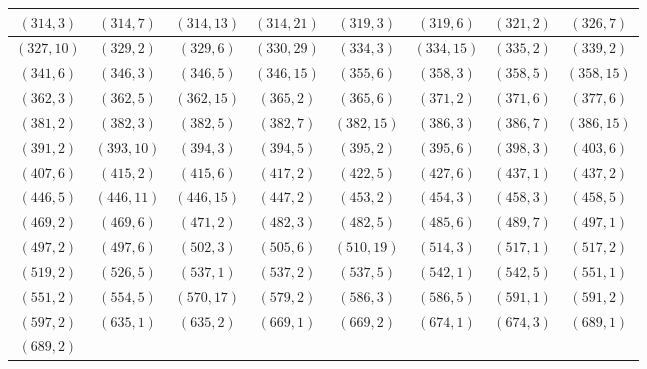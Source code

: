\documentclass[11pt,reqno]{amsart}
\theoremstyle{definition}
\begin{document}
\begin{longtable}{|c|c|c|c|c|c|c|c|}
$ ( 314 , 3 )$
 & 
$ ( 314 , 7 )$
 & 
$ ( 314 , 13 )$
 & 
$ ( 314 , 21 )$
 & 
$ ( 319 , 3 )$
 & 
$ ( 319 , 6 )$
 & 
$ ( 321 , 2 )$
 & 
$ ( 326 , 7 )$
\\ \hline
$ ( 327 , 10 )$
 & 
$ ( 329 , 2 )$
 & 
$ ( 329 , 6 )$
 & 
$ ( 330 , 29 )$
 & 
$ ( 334 , 3 )$
 & 
$ ( 334 , 15 )$
 & 
$ ( 335 , 2 )$
 & 
$ ( 339 , 2 )$
\\ \hline
$ ( 341 , 6 )$
 & 
$ ( 346 , 3 )$
 & 
$ ( 346 , 5 )$
 & 
$ ( 346 , 15 )$
 & 
$ ( 355 , 6 )$
 & 
$ ( 358 , 3 )$
 & 
$ ( 358 , 5 )$
 & 
$ ( 358 , 15 )$
\\ \hline
$ ( 362 , 3 )$
 & 
$ ( 362 , 5 )$
 & 
$ ( 362 , 15 )$
 & 
$ ( 365 , 2 )$
 & 
$ ( 365 , 6 )$
 & 
$ ( 371 , 2 )$
 & 
$ ( 371 , 6 )$
 & 
$ ( 377 , 6 )$
\\ \hline
$ ( 381 , 2 )$
 & 
$ ( 382 , 3 )$
 & 
$ ( 382 , 5 )$
 & 
$ ( 382 , 7 )$
 & 
$ ( 382 , 15 )$
 & 
$ ( 386 , 3 )$
 & 
$ ( 386 , 7 )$
 & 
$ ( 386 , 15 )$
\\ \hline
$ ( 391 , 2 )$
 & 
$ ( 393 , 10 )$
 & 
$ ( 394 , 3 )$
 & 
$ ( 394 , 5 )$
 & 
$ ( 395 , 2 )$
 & 
$ ( 395 , 6 )$
 & 
$ ( 398 , 3 )$
 & 
$ ( 403 , 6 )$
\\ \hline
$ ( 407 , 6 )$
 & 
$ ( 415 , 2 )$
 & 
$ ( 415 , 6 )$
 & 
$ ( 417 , 2 )$
 & 
$ ( 422 , 5 )$
 & 
$ ( 427 , 6 )$
 & 
$ ( 437 , 1 )$
 & 
$ ( 437 , 2 )$
\\ \hline
$ ( 446 , 5 )$
 & 
$ ( 446 , 11 )$
 & 
$ ( 446 , 15 )$
 & 
$ ( 447 , 2 )$
 & 
$ ( 453 , 2 )$
 & 
$ ( 454 , 3 )$
 & 
$ ( 458 , 3 )$
 & 
$ ( 458 , 5 )$
\\ \hline
$ ( 469 , 2 )$
 & 
$ ( 469 , 6 )$
 & 
$ ( 471 , 2 )$
 & 
$ ( 482 , 3 )$
 & 
$ ( 482 , 5 )$
 & 
$ ( 485 , 6 )$
 & 
$ ( 489 , 7 )$
 & 
$ ( 497 , 1 )$
\\ \hline
$ ( 497 , 2 )$
 & 
$ ( 497 , 6 )$
 & 
$ ( 502 , 3 )$
 & 
$ ( 505 , 6 )$
 & 
$ ( 510 , 19 )$
 & 
$ ( 514 , 3 )$
 & 
$ ( 517 , 1 )$
 & 
$ ( 517 , 2 )$
\\ \hline
$ ( 519 , 2 )$
 & 
$ ( 526 , 5 )$
 & 
$ ( 537 , 1 )$
 & 
$ ( 537 , 2 )$
 & 
$ ( 537 , 5 )$
 & 
$ ( 542 , 1 )$
 & 
$ ( 542 , 5 )$
 & 
$ ( 551 , 1 )$
\\ \hline
$ ( 551 , 2 )$
 & 
$ ( 554 , 5 )$
 & 
$ ( 570 , 17 )$
 & 
$ ( 579 , 2 )$
 & 
$ ( 586 , 3 )$
 & 
$ ( 586 , 5 )$
 & 
$ ( 591 , 1 )$
 & 
$ ( 591 , 2 )$
\\ \hline
$ ( 597 , 2 )$
 & 
$ ( 635 , 1 )$
 & 
$ ( 635 , 2 )$
 & 
$ ( 669 , 1 )$
 & 
$ ( 669 , 2 )$
 & 
$ ( 674 , 1 )$
 & 
$ ( 674 , 3 )$
 & 
$ ( 689 , 1 )$
\\ \hline
$ ( 689 , 2 )$

\end{longtable}
\end{document}

